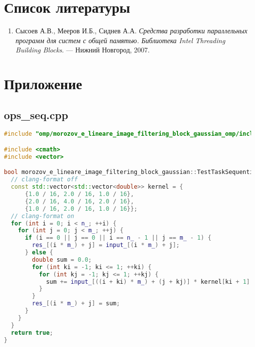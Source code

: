 \documentclass[a4paper,12pt]{article}
\begin{document}
\newpage

\section{Список литературы}
\begin{enumerate}

 Boost C++ Libraries. Boost.MPI Documentation. \\ 
\url{https://www.boost.org/doc/libs/release/libs/mpi/}

 Intel® oneAPI Threading Building Blocks (TBB) Documentation. \\ 
\url{https://www.intel.com/content/www/us/en/developer/tools/oneapi/onetbb}

 OpenMP Architecture Review Board. OpenMP Specifications. \\ 
\url{https://www.openmp.org/specifications/}\

 C++ Standard Library Reference — cppreference.com. \\ 
\url{https://en.cppreference.com/w/}



\item Сысоев А.В., Мееров И.Б., Сиднев А.А. \textit{Средства разработки параллельных программ для систем с общей памятью. Библиотека Intel Threading Building Blocks}. — Нижний Новгород, 2007.
\end{enumerate}

\newpage

\section{Приложение}

\subsection{ops\_seq.cpp}
\begin{lstlisting}[language=C++]
#include "omp/morozov_e_lineare_image_filtering_block_gaussian_omp/include/ops_omp.hpp"

#include <cmath>
#include <vector>

bool morozov_e_lineare_image_filtering_block_gaussian::TestTaskSequential::RunImpl() {
  // clang-format off
  const std::vector<std::vector<double>> kernel = {
      {1.0 / 16, 2.0 / 16, 1.0 / 16},
      {2.0 / 16, 4.0 / 16, 2.0 / 16},
      {1.0 / 16, 2.0 / 16, 1.0 / 16}};
  // clang-format on
  for (int i = 0; i < n_; ++i) {
    for (int j = 0; j < m_; ++j) {
      if (i == 0 || j == 0 || i == n_ - 1 || j == m_ - 1) {
        res_[(i * m_) + j] = input_[(i * m_) + j];
      } else {
        double sum = 0.0;
        for (int ki = -1; ki <= 1; ++ki) {
          for (int kj = -1; kj <= 1; ++kj) {
            sum += input_[((i + ki) * m_) + (j + kj)] * kernel[ki + 1][kj + 1];
          }
        }
        res_[(i * m_) + j] = sum;
      }
    }
  }
  return true;
}
\end{lstlisting}
\end{document}
